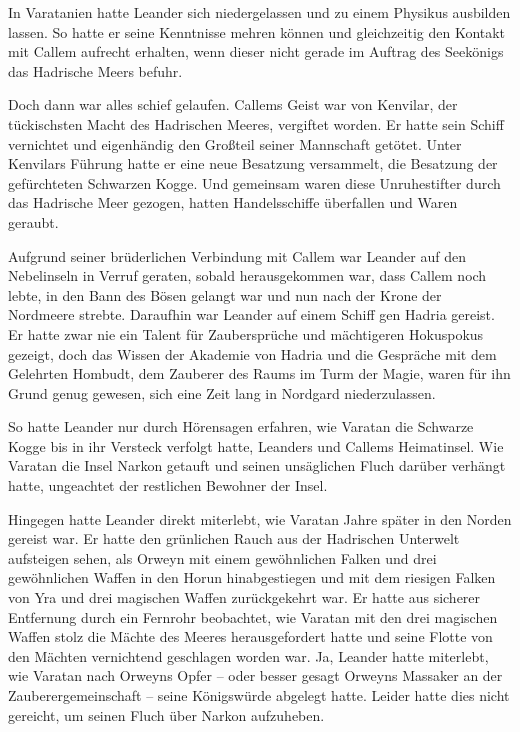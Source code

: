 \documentclass[10pt, a4paper, oneside]{book}
\begin{document}
In Varatanien hatte Leander sich niedergelassen und zu einem Physikus ausbilden lassen. So hatte er seine Kenntnisse mehren können und gleichzeitig den Kontakt mit Callem aufrecht erhalten, wenn dieser nicht gerade im Auftrag des Seekönigs das Hadrische Meers befuhr.

Doch dann war alles schief gelaufen. Callems Geist war von Kenvilar, der tückischsten Macht des Hadrischen Meeres, vergiftet worden. Er hatte sein Schiff vernichtet und eigenhändig den Großteil seiner Mannschaft getötet. Unter Kenvilars Führung hatte er eine neue Besatzung versammelt, die Besatzung der gefürchteten Schwarzen Kogge. Und gemeinsam waren diese Unruhestifter durch das Hadrische Meer gezogen, hatten Handelsschiffe überfallen und Waren geraubt.

Aufgrund seiner brüderlichen Verbindung mit Callem war Leander auf den Nebelinseln in Verruf geraten, sobald herausgekommen war, dass Callem noch lebte, in den Bann des Bösen gelangt war und nun nach der Krone der Nordmeere strebte. Daraufhin war Leander auf einem Schiff gen Hadria gereist. Er hatte zwar nie ein Talent für Zaubersprüche und mächtigeren Hokuspokus gezeigt, doch das Wissen der Akademie von Hadria und die Gespräche mit dem Gelehrten Hombudt, dem Zauberer des Raums im Turm der Magie, waren für ihn Grund genug gewesen, sich eine Zeit lang in Nordgard niederzulassen.

So hatte Leander nur durch Hörensagen erfahren, wie Varatan die Schwarze Kogge bis in ihr Versteck verfolgt hatte, Leanders und Callems Heimatinsel. Wie Varatan die Insel Narkon getauft und seinen unsäglichen Fluch darüber verhängt hatte, ungeachtet der restlichen Bewohner der Insel.

Hingegen hatte Leander direkt miterlebt, wie Varatan Jahre später in den Norden gereist war. Er hatte den grünlichen Rauch aus der Hadrischen Unterwelt aufsteigen sehen, als Orweyn mit einem gewöhnlichen Falken und drei gewöhnlichen Waffen in den Horun hinabgestiegen und mit dem riesigen Falken von Yra und drei magischen Waffen zurückgekehrt war. Er hatte aus sicherer Entfernung durch ein Fernrohr beobachtet, wie Varatan mit den drei magischen Waffen stolz die Mächte des Meeres herausgefordert hatte und seine Flotte von den Mächten vernichtend geschlagen worden war. Ja, Leander hatte miterlebt, wie Varatan nach Orweyns Opfer – oder besser gesagt Orweyns Massaker an der Zauberergemeinschaft – seine Königswürde abgelegt hatte. Leider hatte dies nicht gereicht, um seinen Fluch über Narkon aufzuheben.
\end{document}
